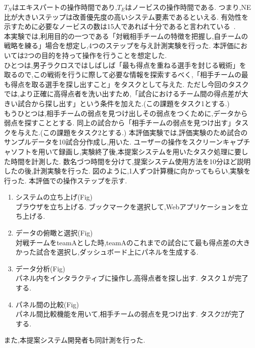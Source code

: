 \documentclass[sotsuron]{kuee}
\begin{document}
					$T_N$はエキスパートの操作時間であり,$T_E$はノービスの操作時間である.
					つまり,NE比が大きいステップは改善優先度の高いシステム要素であるといえる.
					有効性を示すために必要なノービスの数は15人であれば十分であると言われている~\cite{Nielsen}.
					\\本実験では,利用目的の一つである「対戦相手チームの特徴を把握し,自チームの戦略を練る」場合を想定し,4つのステップを与え計測実験を行った.
					本評価においては2つの目的を持って操作を行うことを想定した.
					\\ひとつは,男子ラクロスではしばしば「最も得点を重ねる選手を封じる戦術」を取るので,この戦術を行うに際して必要な情報を探索するべく,「相手チームの最も得点を取る選手を探し出すこと」をタスクとして与えた.
					ただし今回のタスクでは,より正確に高得点者を洗い出すため,「試合におけるチーム間の得点差が大きい試合から探し出す」という条件を加えた.(この課題をタスク1とする.)
					\\もうひとつは,相手チームの弱点を見つけ出しその弱点をつくために,データから弱点を探すこととする.
					同上の試合から「相手チームの弱点を見つけ出す」タスクを与えた.(この課題をタスク2とする.)
					本評価実験では,評価実験のため試合のサンプルデータを10試合分作成し,用いた.
					ユーザーの操作をスクリーンキャプチャソフトを用いて録画し,実験終了後,本提案システムを用いたタスク処理に要した時間を計測した.
					数名づつ時間を分けて,提案システム使用方法を10分ほど説明したの後,計測実験を行った.
					図のように,1人ずつ計算機に向かってもらい,実験を行った.
					本評価での操作ステップを示す.
					\begin{enumerate}
						\item システムの立ち上げ(Fig)
						\\ブラウザを立ち上げる.
						ブックマークを選択して,Webアプリケーションを立ち上げる.
						\item データの俯瞰と選択(Fig)
						\\対戦チームをteamAとした時,teamAのこれまでの試合にて最も得点差の大きかった試合を選択し,ダッシュボード上にパネルを生成する.
						\item データ分析(Fig)
						\\パネル内をインタラクティブに操作し,高得点者を探し出す.
						タスク１が完了する.
						\item パネル間の比較(Fig)
						\\パネル間比較機能を用いて,相手チームの弱点を見つけ出す.
						タスク2が完了する.
					\end{enumerate}
					また,本提案システム開発者も同計測を行った.
\end{document}
